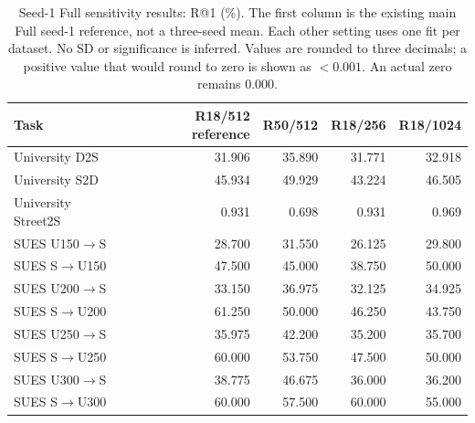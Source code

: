 \begin{table}[!t]
\centering
\caption{Seed-1 Full sensitivity results: R@1 (\%). The first column is the existing main Full seed-1 reference, not a three-seed mean. Each other setting uses one fit per dataset. No SD or significance is inferred. Values are rounded to three decimals; a positive value that would round to zero is shown as $<0.001$. An actual zero remains 0.000.}
\label{tab:sensitivity-r1}
\small
\setlength{\tabcolsep}{3pt}
\begin{tabular}{lrrrr}
\toprule
Task & R18/512 reference & R50/512 & R18/256 & R18/1024 \\
\midrule
University D2S & 31.906 & 35.890 & 31.771 & 32.918 \\
University S2D & 45.934 & 49.929 & 43.224 & 46.505 \\
University Street2S & 0.931 & 0.698 & 0.931 & 0.969 \\
\midrule
SUES U150$\to$S & 28.700 & 31.550 & 26.125 & 29.800 \\
SUES S$\to$U150 & 47.500 & 45.000 & 38.750 & 50.000 \\
SUES U200$\to$S & 33.150 & 36.975 & 32.125 & 34.925 \\
SUES S$\to$U200 & 61.250 & 50.000 & 46.250 & 43.750 \\
SUES U250$\to$S & 35.975 & 42.200 & 35.200 & 35.700 \\
SUES S$\to$U250 & 60.000 & 53.750 & 47.500 & 50.000 \\
SUES U300$\to$S & 38.775 & 46.675 & 36.000 & 36.200 \\
SUES S$\to$U300 & 60.000 & 57.500 & 60.000 & 55.000 \\
\bottomrule
\end{tabular}
\end{table}
